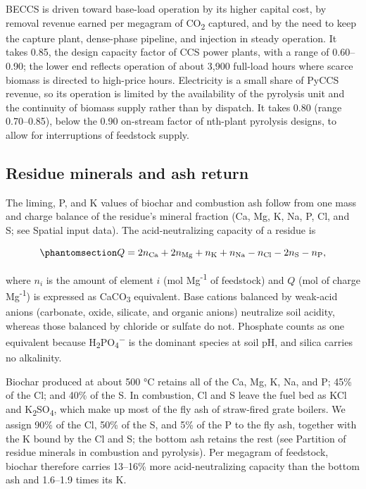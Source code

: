 \documentclass[
  letterpaper,
  twoside,
  twocolumn,
  9pt]{article}
\begin{document}
BECCS is driven toward base-load operation by its higher capital cost,
by removal revenue earned per megagram of CO\textsubscript{2} captured,
and by the need to keep the capture plant, dense-phase pipeline, and
injection in steady operation.\citep{johansson2019, prado2023} It takes
0.85, the design capacity factor of CCS power
plants,\citep{petranova2020} with a range of 0.60--0.90; the lower end
reflects operation of about 3,900 full-load hours where scarce biomass
is directed to high-price hours.\citep{lehtveer2021} Electricity is a
small share of PyCCS revenue, so its operation is limited by the
availability of the pyrolysis unit and the continuity of biomass supply
rather than by dispatch. It takes 0.80 (range 0.70--0.85), below the
0.90 on-stream factor of nth-plant pyrolysis designs,\citep{dutta2015}
to allow for interruptions of feedstock supply.

\subsection{Residue minerals and ash
return}\label{residue-minerals-and-ash-return}

The liming, P, and K values of biochar and combustion ash follow from
one mass and charge balance of the residue's mineral fraction (Ca, Mg,
K, Na, P, Cl, and S; see Spatial input data). The acid-neutralizing
capacity of a residue is

\begin{equation}\phantomsection\label{eq-anc}{Q = 2n_{\mathrm{Ca}} + 2n_{\mathrm{Mg}} + n_{\mathrm{K}} + n_{\mathrm{Na}} - n_{\mathrm{Cl}} - 2n_{\mathrm{S}} - n_{\mathrm{P}},}\end{equation}

where \(n_i\) is the amount of element \(i\) (mol Mg\textsuperscript{-1}
of feedstock) and \(Q\) (mol of charge Mg\textsuperscript{-1}) is
expressed as CaCO\textsubscript{3} equivalent. Base cations balanced by
weak-acid anions (carbonate, oxide, silicate, and organic anions)
neutralize soil acidity, whereas those balanced by chloride or sulfate
do not. Phosphate counts as one equivalent because
H\textsubscript{2}PO\textsubscript{4}\textsuperscript{−} is the dominant
species at soil pH, and silica carries no alkalinity.

Biochar produced at about 500 °C retains all of the Ca, Mg, K, Na, and
P; 45\% of the Cl; and 40\% of the S.\citep{saleh2014, knudsen2004} In
combustion, Cl and S leave the fuel bed as KCl and
K\textsubscript{2}SO\textsubscript{4}, which make up most of the fly ash
of straw-fired grate boilers.\citep{thomsen2006} We assign 90\% of the
Cl, 50\% of the S, and 5\% of the P to the fly ash, together with the K
bound by the Cl and S; the bottom ash retains the rest (see Partition of
residue minerals in combustion and pyrolysis). Per megagram of
feedstock, biochar therefore carries 13--16\% more acid-neutralizing
capacity than the bottom ash and 1.6--1.9 times its K.
\end{document}
